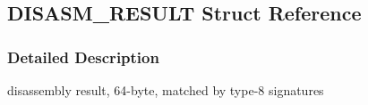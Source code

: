 \hypertarget{struct_d_i_s_a_s_m___r_e_s_u_l_t}{
\subsection{DISASM\_\-RESULT Struct Reference}
\label{struct_d_i_s_a_s_m___r_e_s_u_l_t}
}


\subsubsection{Detailed Description}
disassembly result, 64-\/byte, matched by type-\/8 signatures 